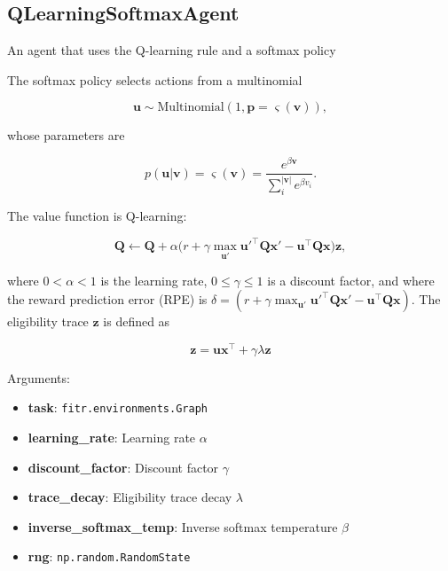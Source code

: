 \subsection{QLearningSoftmaxAgent}\label{qlearningsoftmaxagent}

\begin{Shaded}
\begin{Highlighting}[]
\end{Highlighting}
\end{Shaded}

An agent that uses the Q-learning rule and a softmax policy

The softmax policy selects actions from a multinomial

\[
\mathbf u \sim \mathrm{Multinomial}(1, \mathbf p=\varsigma(\mathbf v)),
\]

whose parameters are

\[
p(\mathbf u|\mathbf v) = \varsigma(\mathbf v) = \frac{e^{\beta \mathbf v}}{\sum_{i}^{|\mathbf v|} e^{\beta v_i}}.
\]

The value function is Q-learning:

\[
\mathbf Q \gets \mathbf Q + \alpha \big(r + \gamma \max_{\mathbf u'} \mathbf u'^\top \mathbf Q \mathbf x' - \mathbf u^\top \mathbf Q \mathbf x \big) \mathbf z,
\]

where \(0 < \alpha < 1\) is the learning rate, \(0 \leq \gamma \leq 1\)
is a discount factor, and where the reward prediction error (RPE) is
\(\delta = (r + \gamma \max_{\mathbf u'} \mathbf u'^\top \mathbf Q \mathbf x' - \mathbf u^\top \mathbf Q \mathbf x)\).
The eligibility trace \(\mathbf z\) is defined as

\[
\mathbf z = \mathbf u \mathbf x^\top +  \gamma \lambda \mathbf z
\]

Arguments:

\begin{itemize}
\tightlist
\item
  \textbf{task}: \texttt{fitr.environments.Graph}
\item
  \textbf{learning\_rate}: Learning rate \(\alpha\)
\item
  \textbf{discount\_factor}: Discount factor \(\gamma\)
\item
  \textbf{trace\_decay}: Eligibility trace decay \(\lambda\)
\item
  \textbf{inverse\_softmax\_temp}: Inverse softmax temperature \(\beta\)
\item
  \textbf{rng}: \texttt{np.random.RandomState}
\end{itemize}

